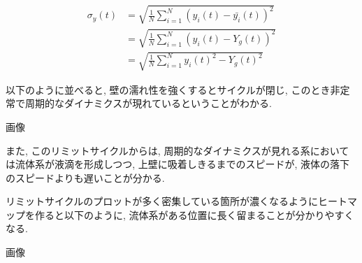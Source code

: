 \begin{align}
  \sigma_{y} (t)
  &= \sqrt{\frac{1}{N} \sum_{i=1}^{N} (y_i (t) - \bar{y_i}(t) )^2} \\
  &= \sqrt{\frac{1}{N} \sum_{i=1}^{N} (y_i (t) - Y_g (t) )^2} \\
  &= \sqrt{\frac{1}{N} \sum_{i=1}^{N} {{y_i} (t)}^2 - {{Y_g} (t)}^2}
\end{align}

以下のように並べると, 壁の濡れ性を強くするとサイクルが閉じ, このとき非定常で周期的なダイナミクスが現れているということがわかる.

画像

また, このリミットサイクルからは, 周期的なダイナミクスが見れる系においては流体系が液滴を形成しつつ, 上壁に吸着しきるまでのスピードが, 液体の落下のスピードよりも遅いことが分かる.


% 


% 



リミットサイクルのプロットが多く密集している箇所が濃くなるようにヒートマップを作ると以下のように, 流体系がある位置に長く留まることが分かりやすくなる.

画像

% 


